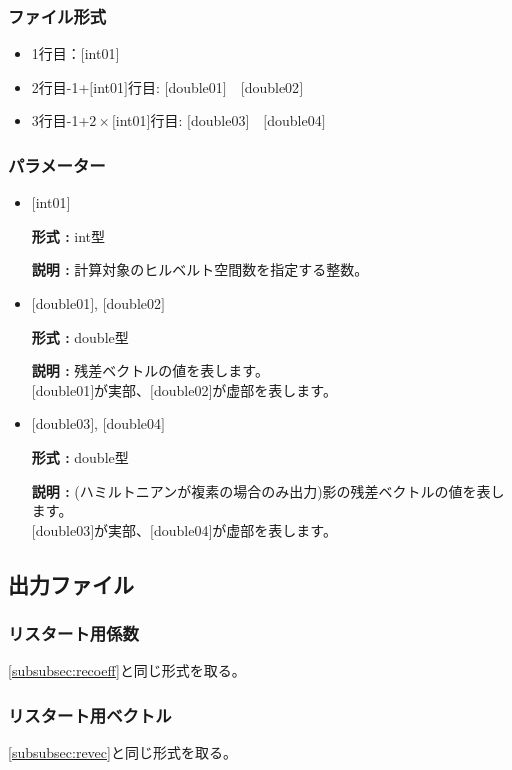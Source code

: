 \documentclass[12pt,titlepage]{jarticle}
\begin{document}
\subsubsection{ファイル形式}
 \begin{itemize}
   \item  1行目：$[$int01$]$
   \item  2行目-1+$[$int01$]$行目: $[$double01$]$~~$[$double02$]$
   \item  3行目-1+$2\times[$int01$]$行目: $[$double03$]$~~$[$double04$]$
  \end{itemize}
\subsubsection{パラメーター}
\begin{itemize}

\item  $[$int01$]$
  
  {\bf 形式 :} int型
  
  {\bf 説明 :} 計算対象のヒルベルト空間数を指定する整数。
  
\item  $[$double01$]$, $[$double02$]$
  
  {\bf 形式 :} double型 

  {\bf 説明 :} 残差ベクトルの値を表します。\\
  $[$double01$]$が実部、$[$double02$]$が虚部を表します。\\

\item  $[$double03$]$, $[$double04$]$
  
  {\bf 形式 :} double型 

  {\bf 説明 :} (ハミルトニアンが複素の場合のみ出力)影の残差ベクトルの値を表します。\\
  $[$double03$]$が実部、$[$double04$]$が虚部を表します。\\

\end{itemize}

\newpage
\subsection{出力ファイル}
\subsubsection{リスタート用係数}\label{subsubsec:ResCoef}
\ref{subsubsec:recoeff}と同じ形式を取る。
\subsubsection{リスタート用ベクトル}\label{subsubsec:ResVec}
\ref{subsubsec:revec}と同じ形式を取る。
\end{document}
